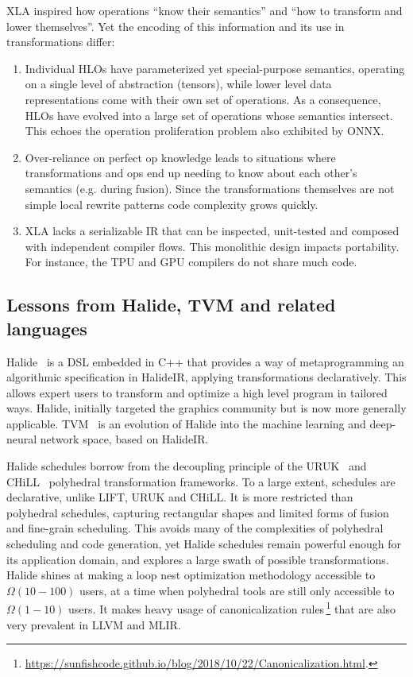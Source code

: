 XLA inspired how operations ``know their semantics'' and ``how to transform and lower themselves''. 
Yet the encoding of this information and its use in transformations differ:
\begin{enumerate}
\item Individual HLOs have parameterized yet special-purpose semantics, operating on a single level of abstraction (tensors), while lower level data representations come with their own set of operations. As a consequence, HLOs have evolved into a large set of operations whose semantics intersect. This echoes the operation proliferation problem also exhibited by ONNX.
\item Over-reliance on perfect op knowledge leads to situations where transformations and ops end up needing to know about each other's semantics (e.g. during fusion). Since the transformations themselves are not simple local rewrite patterns code complexity grows quickly.
\item XLA lacks a serializable IR that can be inspected, unit-tested and composed with independent compiler flows. 
This monolithic design impacts portability. 
For instance, the TPU and GPU compilers do not share much code.
\end{enumerate}

\subsection{Lessons from Halide, TVM and related languages}
Halide~\cite{ragan2013halide} is a DSL embedded in C++ that provides a way of metaprogramming an algorithmic specification in HalideIR, applying transformations declaratively. This allows expert users to transform and optimize a high level program in tailored ways. Halide, initially targeted the graphics community but is now more generally applicable.
TVM~\cite{chen2018tvm} is an evolution of Halide into the machine learning and deep-neural network space, based on HalideIR.

Halide schedules borrow from the decoupling principle of the URUK~\cite{URUK} and CHiLL~\cite{CHiLL} polyhedral transformation frameworks. To a large extent, schedules are declarative, unlike LIFT, URUK and CHiLL. It is more restricted than polyhedral schedules, capturing rectangular shapes and limited forms of fusion and fine-grain scheduling. This avoids many of the complexities of polyhedral scheduling and code generation, yet Halide schedules remain powerful enough for its application domain, and explores a large swath of possible transformations.  Halide shines at making a loop nest optimization methodology accessible to $\Omega(10-100)$ users, at a time when polyhedral tools are still only accessible to $\Omega(1-10)$ users. It makes heavy usage of canonicalization rules\,\footnote{\url{https://sunfishcode.github.io/blog/2018/10/22/Canonicalization.html}.} that are also very prevalent in LLVM and MLIR.

